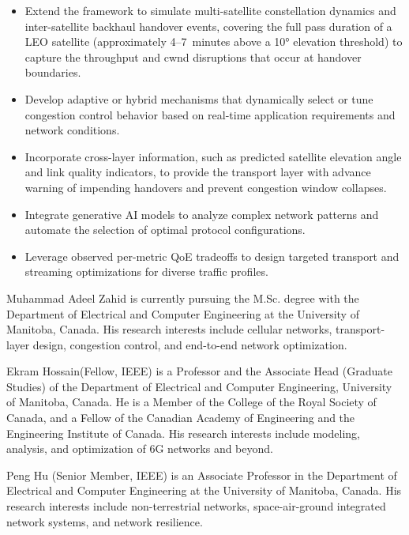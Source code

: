 \documentclass[journal]{IEEEtran}
\begin{document}
\begin{itemize}
    \item Extend the framework to simulate multi-satellite constellation dynamics and inter-satellite backhaul handover events, covering the full pass duration of a LEO satellite (approximately 4--7~minutes above a 10° elevation threshold) to capture the throughput and cwnd disruptions that occur at handover boundaries.

    \item Develop adaptive or hybrid mechanisms that dynamically select or tune congestion control behavior based on real-time application requirements and network conditions.
    \item Incorporate cross-layer information, such as predicted satellite elevation angle and link quality indicators, to provide the transport layer with advance warning of impending handovers and prevent congestion window collapses.
    \item Integrate generative AI models to analyze complex network patterns and automate the selection of optimal protocol configurations.
    \item Leverage observed per-metric QoE tradeoffs to design targeted transport and streaming optimizations for diverse traffic profiles.
\end{itemize}

\ifCLASSOPTIONcaptionsoff
\newpage
\fi




\begin{IEEEbiographynophoto}{Muhammad Adeel Zahid} is currently pursuing the M.Sc. degree with the Department of Electrical and Computer Engineering at the University of Manitoba, Canada. His research interests include cellular networks, transport-layer design, congestion control, and end-to-end network optimization.
\end{IEEEbiographynophoto}

\begin{IEEEbiographynophoto}{Ekram Hossain}(Fellow, IEEE) is a Professor and the Associate Head (Graduate Studies) of the Department of Electrical and Computer Engineering, University of Manitoba, Canada. He is a Member of the College of the Royal Society of Canada, and a Fellow of the Canadian Academy of Engineering and the Engineering Institute of Canada. His research interests include modeling, analysis, and optimization of 6G networks and beyond.
\end{IEEEbiographynophoto}

\begin{IEEEbiographynophoto}
{Peng Hu} (Senior Member, IEEE) is an Associate Professor in the Department of Electrical and Computer Engineering at the University of Manitoba, Canada. His research interests include non-terrestrial networks, space-air-ground integrated network systems, and network resilience.
\end{IEEEbiographynophoto}
%
\end{document}
